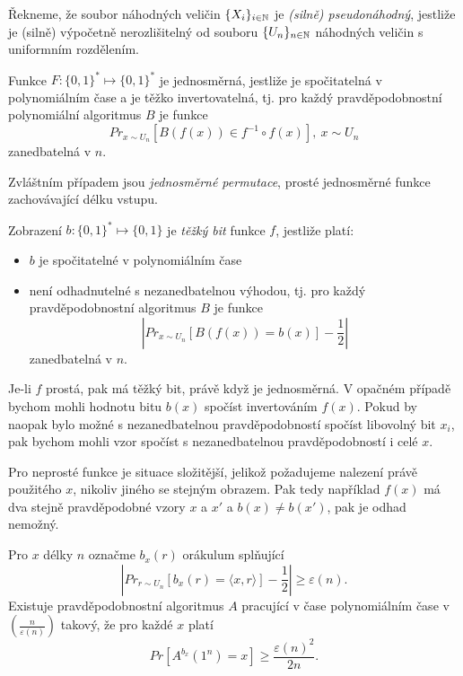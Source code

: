 \begin{defn}
	Řekneme, že soubor náhodných veličin $\{X_i\}_{i\in\mathbb{N}}$ je \textit{(silně) pseudonáhodný}, jestliže je (silně) výpočetně nerozlišitelný od souboru $\{U_n\}_{n\in\mathbb{N}}$ náhodných veličin s uniformním rozdělením.
\end{defn}

\begin{defn}
	Funkce $F:\{0,1\}^*\mapsto \{0,1\}^*$ je jednosměrná, jestliže je spočitatelná v polynomiálním čase a je těžko invertovatelná, tj. pro každý pravděpodobnostní polynomiální algoritmus $B$ je funkce
	\[
		Pr_{x\sim U_n}[B(f(x)) \in f^{-1}\circ f(x)],\ x\sim U_n
	\]
	zanedbatelná v $n$.
\end{defn}

Zvláštním případem jsou \textit{jednosměrné permutace}, prosté jednosměrné funkce zachovávající délku vstupu.

\begin{defn}
	Zobrazení $b:\{0,1\}^*\mapsto \{0,1\}$ je \textit{těžký bit} funkce $f$, jestliže platí:
	\begin{itemize}
		\item $b$ je spočitatelné v polynomiálním čase
		\item není odhadnutelné s nezanedbatelnou výhodou, tj. pro každý pravděpodobnostní algoritmus $B$ je funkce
		\[
			|Pr_{x\sim U_n}[B(f(x)) = b(x)]-\frac{1}{2}|
		\]
		zanedbatelná v $n$.
	\end{itemize}
\end{defn}

Je-li $f$ prostá, pak má těžký bit, právě když je jednosměrná. V opačném případě bychom mohli hodnotu bitu $b(x)$ spočíst invertováním $f(x)$. Pokud by naopak bylo možné s nezanedbatelnou pravděpodobností spočíst libovolný bit $x_i$, pak bychom mohli vzor spočíst s nezanedbatelnou pravděpodobností i celé $x$.

Pro neprosté funkce je situace složitější, jelikož požadujeme nalezení právě použitého $x$, nikoliv jiného se stejným obrazem. Pak tedy například $f(x)$ má dva stejně pravděpodobné vzory $x$ a $x'$ a $b(x)\neq b(x')$, pak je odhad nemožný.

\begin{lemma}\label{lemma:oracle}
	Pro $x$ délky $n$ označme $b_x(r)$ orákulum splňující
	\[
		|Pr_{r\sim U_n}[b_x(r)=\langle x,r\rangle]-\frac{1}{2}| \geq \varepsilon(n).
	\]
	Existuje pravděpodobnostní algoritmus $A$ pracující v čase polynomiálním čase v $(\frac{n}{\varepsilon(n)})$ takový, že pro každé $x$ platí
	\[
		Pr[A^{b_x}(1^n)=x]\geq \frac{\varepsilon(n)^2}{2n}.
	\]
\end{lemma}

